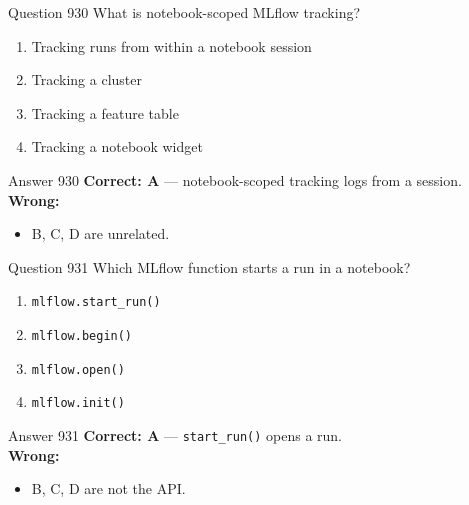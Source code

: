 \documentclass[aspectratio=169,11pt]{beamer}
\begin{document}
	\begin{frame}{Question 930}
		What is notebook-scoped MLflow tracking?
		\begin{enumerate}[label=\Alph*.]
			\item Tracking runs from within a notebook session
			\item Tracking a cluster
			\item Tracking a feature table
			\item Tracking a notebook widget
		\end{enumerate}
	\end{frame}
	\begin{frame}{Answer 930}
		\textbf{Correct: A} --- notebook-scoped tracking logs from a session.\\
		\vspace{0.5em}
		\textbf{Wrong:}
		\begin{itemize}
			\item B, C, D are unrelated.
		\end{itemize}
	\end{frame}
	
	\begin{frame}{Question 931}
		Which MLflow function starts a run in a notebook?
		\begin{enumerate}[label=\Alph*.]
			\item \texttt{mlflow.start\_run()}
			\item \texttt{mlflow.begin()}
			\item \texttt{mlflow.open()}
			\item \texttt{mlflow.init()}
		\end{enumerate}
	\end{frame}
	\begin{frame}{Answer 931}
		\textbf{Correct: A} --- \texttt{start\_run()} opens a run.\\
		\vspace{0.5em}
		\textbf{Wrong:}
		\begin{itemize}
			\item B, C, D are not the API.
		\end{itemize}
	\end{frame}
	
\end{document}
